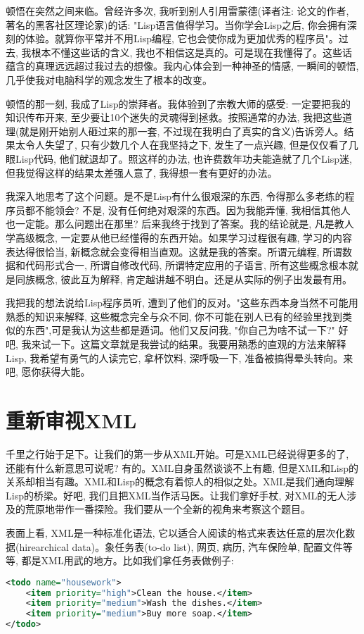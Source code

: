 \documentclass[10pt]{article}
\begin{document}
顿悟在突然之间来临。曾经许多次, 我听到别人引用雷蒙德(译者注: 论文\label{}的作者, 著名的黑客社区理论家)的话: "Lisp语言值得学习。当你学会Lisp之后, 你会拥有深刻的体验。就算你平常并不用Lisp编程, 它也会使你成为更加优秀的程序员"。过去, 我根本不懂这些话的含义, 我也不相信这是真的。可是现在我懂得了。这些话蕴含的真理远远超过我过去的想像。我内心体会到一种神圣的情感, 一瞬间的顿悟, 几乎使我对电脑科学的观念发生了根本的改变。

顿悟的那一刻, 我成了Lisp的崇拜者。我体验到了宗教大师的感受: 一定要把我的知识传布开来, 至少要让10个迷失的灵魂得到拯救。按照通常的办法, 我把这些道理(就是刚开始别人砸过来的那一套, 不过现在我明白了真实的含义)告诉旁人。结果太令人失望了, 只有少数几个人在我坚持之下, 发生了一点兴趣, 但是仅仅看了几眼Lisp代码, 他们就退却了。照这样的办法, 也许费数年功夫能造就了几个Lisp迷, 但我觉得这样的结果太差强人意了, 我得想一套有更好的办法。

我深入地思考了这个问题。是不是Lisp有什么很艰深的东西, 令得那么多老练的程序员都不能领会? 不是, 没有任何绝对艰深的东西。因为我能弄懂, 我相信其他人也一定能。那么问题出在那里? 后来我终于找到了答案。我的结论就是, 凡是教人学高级概念, 一定要从他已经懂得的东西开始。如果学习过程很有趣, 学习的内容表达得很恰当, 新概念就会变得相当直观。这就是我的答案。所谓元编程, 所谓数据和代码形式合一, 所谓自修改代码, 所谓特定应用的子语言, 所有这些概念根本就是同族概念, 彼此互为解释, 肯定越讲越不明白。还是从实际的例子出发最有用。

我把我的想法说给Lisp程序员听, 遭到了他们的反对。"这些东西本身当然不可能用熟悉的知识来解释, 这些概念完全与众不同, 你不可能在别人已有的经验里找到类似的东西",可是我认为这些都是遁词。他们又反问我, "你自己为啥不试一下?" 好吧, 我来试一下。这篇文章就是我尝试的结果。我要用熟悉的直观的方法来解释Lisp, 我希望有勇气的人读完它, 拿杯饮料, 深呼吸一下, 准备被搞得晕头转向。来吧, 愿你获得大能。
\section{重新审视XML}
\label{sec-2}

千里之行始于足下。让我们的第一步从XML开始。可是XML已经说得更多的了, 还能有什么新意思可说呢? 有的。XML自身虽然谈谈不上有趣, 但是XML和Lisp的关系却相当有趣。XML和Lisp的概念有着惊人的相似之处。XML是我们通向理解Lisp的桥梁。好吧, 我们且把XML当作活马医。让我们拿好手杖, 对XML的无人涉及的荒原地带作一番探险。我们要从一个全新的视角来考察这个题目。

表面上看, XML是一种标准化语法, 它以适合人阅读的格式来表达任意的层次化数据(hirearchical data)。象任务表(to-do list), 网页, 病历, 汽车保险单, 配置文件等等, 都是XML用武的地方。比如我们拿任务表做例子:
\begin{lstlisting}[language=xml]
<todo name="housework">
    <item priority="high">Clean the house.</item>
    <item priority="medium">Wash the dishes.</item>
    <item priority="medium">Buy more soap.</item>
</todo>
\end{lstlisting}
\end{document}

